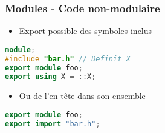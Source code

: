\documentclass[C++.tex]{subfiles}
\begin{document}
\begin{frame}[fragile]
	\frametitle{Modules - Code non-modulaire}
	\begin{itemize}
		\item Export possible des symboles inclus
	\end{itemize}

	\begin{lstlisting}[language=C++]
module;
#include "bar.h" // Definit X
export module foo;
export using X = ::X;\end{lstlisting}

	\begin{itemize}
		\item Ou de l'en-tête dans son ensemble
	\end{itemize}

	\begin{lstlisting}[language=C++]
export module foo;
export import "bar.h";\end{lstlisting}
\end{frame}
\end{document}
